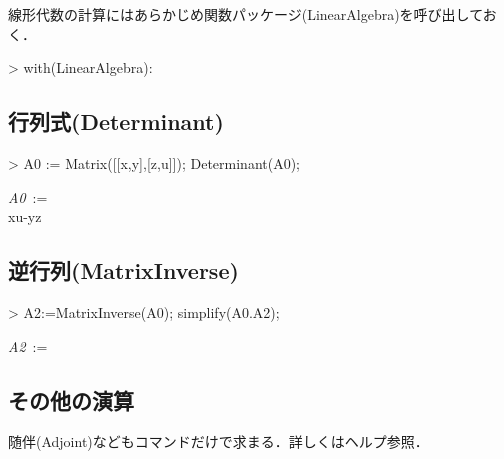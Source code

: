 線形代数の計算にはあらかじめ関数パッケージ(LinearAlgebra)を呼び出しておく．
\begin{MapleInput}
> with(LinearAlgebra):
\end{MapleInput}

\subsection{行列式(Determinant)}
\begin{MapleInput}
> A0 := Matrix([[x,y],[z,u]]); Determinant(A0);
\end{MapleInput}
\begin{MapleOutputGather}
{\it A0}\, := \, \left[ \begin {array}{cc} x&y\\  z&u\end {array} \right] \notag \\
xu-yz \notag
\end{MapleOutputGather}

\subsection{逆行列(MatrixInverse)}
\begin{MapleInput}
> A2:=MatrixInverse(A0); simplify(A0.A2);
\end{MapleInput}
\begin{MapleOutputGather}
{\it A2}\, := \, \notag \\
\left[ \begin {array}{cc} 1&0\\  0&1\end {array} \right]\notag
\end{MapleOutputGather}

\subsection{その他の演算}
随伴(Adjoint)などもコマンドだけで求まる．詳しくはヘルプ参照．
